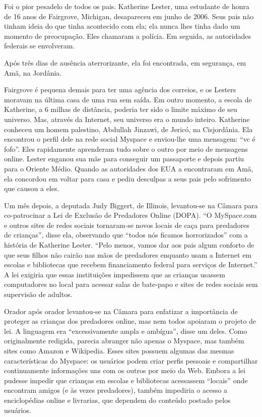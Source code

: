 \begin{tcolorbox}[[%
    enhanced,
    breakable,
    skin first=enhanced,
    skin middle=enhanced,
    skin last=enhanced,
    title={Você Sabe Onde Seu Filho Está na Internet Esta Noite?}
    ]
    Foi o pior pesadelo de todos os pais. Katherine Lester, uma estudante de honra de 16 anos
    de Fairgrove, Michigan, desapareceu em junho de 2006. Seus pais não tinham ideia do que
    tinha acontecido com ela; ela nunca lhes tinha dado um momento de preocupação. Eles chamaram
    a polícia. Em seguida, as autoridades federais se envolveram.
    
    Após três dias de ausência aterrorizante, ela foi encontrada, em segurança, em Amã, na
    Jordânia.
    
    Fairgrove é pequena demais para ter uma agência dos correios, e os Lesters moravam na última
    casa de uma rua sem saída. Em outro momento, a escola de Katherine, a 6 milhas de distância,
    poderia ter sido o limite máximo de seu universo. Mas, através da Internet, seu universo era
    o mundo inteiro. Katherine conheceu um homem palestino, Abdullah Jinzawi, de Jericó, na
    Cisjordânia. Ela encontrou o perfil dele na rede social Myspace e enviou-lhe uma mensagem:
    ``vc é fofo''. Eles rapidamente aprenderam tudo sobre o outro por meio de mensagens online.
    Lester enganou sua mãe para conseguir um passaporte e depois partiu para o Oriente Médio.
    Quando as autoridades dos EUA a encontraram em Amã, ela concordou em voltar para casa e pediu
    desculpas a seus pais pelo sofrimento que causou a eles.
    
    Um mês depois, a deputada Judy Biggert, de Illinois, levantou-se na Câmara para co-patrocinar
    a Lei de Exclusão de Predadores Online (DOPA). ``O MySpace.com e outros sites de redes
    sociais tornaram-se novos locais de caça para predadores de crianças'', disse ela, observando
    que ``todos nós ficamos horrorizados'' com a história de Katherine Lester. ``Pelo menos, vamos
    dar aos pais algum conforto de que seus filhos não cairão nas mãos de predadores enquanto
    usam a Internet em escolas e bibliotecas que recebem financiamento federal para serviços de
    Internet.'' A lei exigiria que essas instituições impedissem que as crianças usassem
    computadores no local para acessar salas de bate-papo e sites de redes sociais sem supervisão
    de adultos.
    
    Orador após orador levantou-se na Câmara para enfatizar a importância de proteger as crianças
    dos predadores online, mas nem todos apoiaram o projeto de lei. A linguagem era
    ``excessivamente ampla e ambígua'', disse um deles. Como originalmente redigida, parecia
    abranger não apenas o Myspace, mas também sites como Amazon e Wikipedia. Esses sites possuem
    algumas das mesmas características do Myspace: os usuários podem criar perfis pessoais e
    compartilhar continuamente informações uns com os outros por meio da Web. Embora a lei
    pudesse impedir que crianças em escolas e bibliotecas acessassem ``locais'' onde encontram
    amigos (e às vezes predadores), também impediria o acesso a enciclopédias online e
    livrarias, que dependem do conteúdo postado pelos usuários.
    

\end{tcolorbox}

